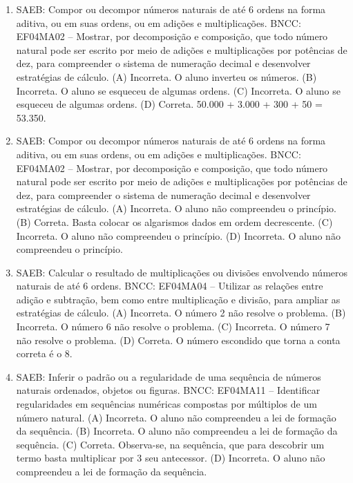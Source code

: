 \begin{enumerate}
\item
SAEB: Compor ou decompor números naturais de até 6 ordens na
forma aditiva, ou em suas ordens, ou em adições e multiplicações.
BNCC: EF04MA02 -- Mostrar, por decomposição e composição, que todo número natural pode ser escrito
por meio de adições e multiplicações por potências de dez, para compreender o sistema de
numeração decimal e desenvolver estratégias de cálculo.
(A) Incorreta. O aluno inverteu os números.
(B) Incorreta. O aluno se esqueceu de algumas ordens.
(C) Incorreta. O aluno se esqueceu de algumas ordens.
(D) Correta. 50.000 + 3.000 + 300 + 50 = 53.350.

\item
SAEB: Compor ou decompor números naturais de até 6 ordens na
forma aditiva, ou em suas ordens, ou em adições e multiplicações.
BNCC: EF04MA02 -- Mostrar, por decomposição e composição, que todo número natural pode ser escrito
por meio de adições e multiplicações por potências de dez, para compreender o sistema de
numeração decimal e desenvolver estratégias de cálculo.
(A) Incorreta. O aluno não compreendeu o princípio.
(B) Correta. Basta colocar os algarismos dados em ordem decrescente.
(C) Incorreta. O aluno não compreendeu o princípio.
(D) Incorreta. O aluno não compreendeu o princípio.

\item
SAEB: Calcular o resultado de multiplicações ou divisões
envolvendo números naturais de até 6 ordens.
BNCC: EF04MA04 -- Utilizar as relações entre adição e subtração, bem como entre multiplicação e divisão,
para ampliar as estratégias de cálculo.
(A) Incorreta. O número 2 não resolve o problema.
(B) Incorreta. O número 6 não resolve o problema.
(C) Incorreta. O número 7 não resolve o problema.
(D) Correta. O número escondido que torna a conta correta é o 8.

\item
SAEB: Inferir o padrão ou a regularidade de uma sequência de
números naturais ordenados, objetos ou figuras.
BNCC: EF04MA11 -- Identificar regularidades em sequências numéricas compostas por múltiplos de um
número natural.
(A) Incorreta. O aluno não compreendeu a lei de formação da sequência.
(B) Incorreta. O aluno não compreendeu a lei de formação da sequência.
(C) Correta. Observa-se, na sequência, que para descobrir um termo basta
multiplicar por 3 seu antecessor.
(D) Incorreta. O aluno não compreendeu a lei de formação da sequência.


\end{enumerate}
